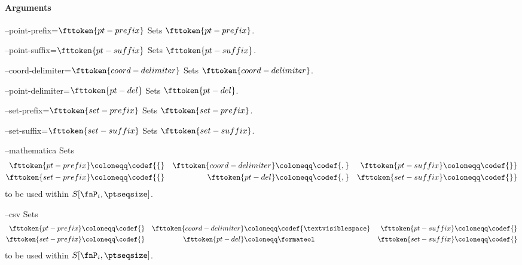 \paragraph{Arguments}

\procarginseq{\ptseqsize}

\procargout

\begin{procarg}{--point-prefix=$\fttoken{pt-prefix}$}
  Sets $\fttoken{pt-prefix}$.
\end{procarg}

\begin{procarg}{--point-suffix=$\fttoken{pt-suffix}$}
  Sets $\fttoken{pt-suffix}$.
\end{procarg}

\begin{procarg}{--coord-delimiter=$\fttoken{coord-delimiter}$}
  Sets $\fttoken{coord-delimiter}$.
\end{procarg}

\begin{procarg}{--point-delimiter=$\fttoken{pt-del}$}
  Sets $\fttoken{pt-del}$.
\end{procarg}

\begin{procarg}{--set-prefix=$\fttoken{set-prefix}$}
  Sets $\fttoken{set-prefix}$.
\end{procarg}

\begin{procarg}{--set-suffix=$\fttoken{set-suffix}$}
  Sets $\fttoken{set-suffix}$.
\end{procarg}

\begin{procarg}{--mathematica}
  Sets 
  \begin{align*}
    \fttoken{pt-prefix} &\coloneqq \codef{\{} &
    \fttoken{coord-delimiter} &\coloneqq \codef{,} &
    \fttoken{pt-suffix} &\coloneqq \codef{\}} \\
    \fttoken{set-prefix} &\coloneqq \codef{\{} &
    \fttoken{pt-del} &\coloneqq \codef{,} &
    \fttoken{set-suffix} &\coloneqq \codef{\}}
  \end{align*}
  to be used within $S[\fnP_i, \ptseqsize]$.
\end{procarg}

\begin{procarg}{--csv}
  Sets 
  \begin{align*}
    \fttoken{pt-prefix} &\coloneqq \codef{} &
    \fttoken{coord-delimiter} &\coloneqq \codef{\textvisiblespace } &
    \fttoken{pt-suffix} &\coloneqq \codef{} \\
    \fttoken{set-prefix} &\coloneqq \codef{} &
    \fttoken{pt-del} &\coloneqq \formateol &
    \fttoken{set-suffix} &\coloneqq \codef{}
  \end{align*}
  to be used within $S[\fnP_i, \ptseqsize]$.
\end{procarg}

